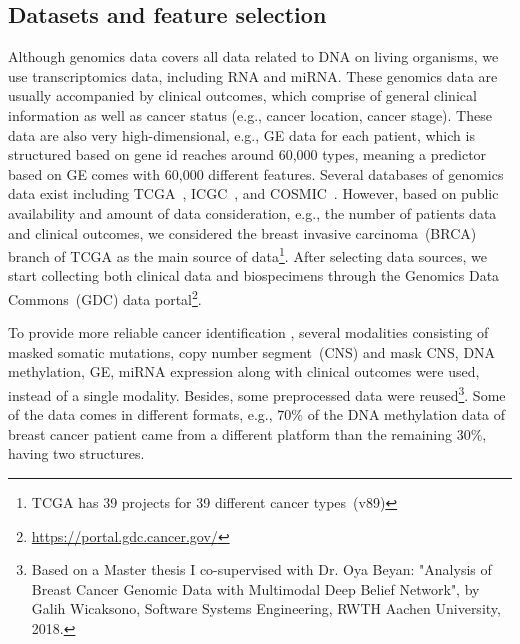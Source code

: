 \subsection{Datasets and feature selection}
\label{dc}
Although genomics data covers all data related to DNA on living organisms, we use transcriptomics data, including RNA and miRNA. These genomics data are usually accompanied by clinical outcomes, which comprise of general clinical information as well as cancer status (e.g., cancer location, cancer stage). These data are also very high-dimensional, e.g., GE data for each patient, which is structured based on gene id reaches around 60,000 types, meaning a predictor based on GE comes with 60,000 different features. Several databases of genomics data exist including TCGA~\cite{tcga}, ICGC~\cite{icgc}, and COSMIC~\cite{forbes}. However, based on public availability and amount of data consideration, e.g., the number of patients data and clinical outcomes, we considered the breast invasive carcinoma~(BRCA) branch of TCGA as the main source of data\footnote{TCGA has 39 projects for 39 different cancer types~(v89)}. After selecting data sources, we start collecting both clinical data and biospecimens through the Genomics Data Commons~(GDC) data portal\footnote{\url{https://portal.gdc.cancer.gov/}}. 

\hspace*{3.5mm} To provide more reliable cancer identification 
, several modalities consisting of masked somatic mutations, copy number segment~(CNS) and mask CNS, DNA methylation, GE, miRNA expression along with clinical outcomes were used, instead of a single modality. Besides, some preprocessed data were reused\footnote{Based on a Master thesis I co-supervised with Dr. Oya Beyan: "Analysis of Breast Cancer Genomic Data with Multimodal Deep Belief Network", by Galih Wicaksono, Software Systems Engineering, RWTH Aachen University, 2018.}. Some of the data comes in different formats, e.g., $70\%$ of the DNA methylation data of breast cancer patient came from a different platform than the remaining $30\%$, having two structures. 

